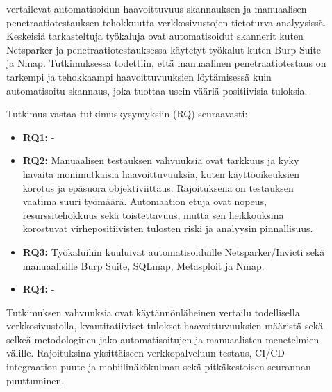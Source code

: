 \documentclass[bscthesis,finnish,oneside,biblatex]{uefcsthesis}
\begin{document}
\begin{description}
    \item[\cite{rane2024_analysis_scanning}] vertailevat automatisoidun haavoittuvuus skannauksen ja manuaalisen penetraatiotestauksen tehokkuutta verkkosivustojen tietoturva-analyysissä. Keskeisiä tarkasteltuja työkaluja ovat automatisoidut skannerit kuten Netsparker ja penetraatiotestauksessa käytetyt työkalut kuten Burp Suite ja Nmap. Tutkimuksessa todettiin, että manuaalinen penetraatiotestaus on tarkempi ja tehokkaampi haavoittuvuuksien löytämisessä kuin automatisoitu skannaus, joka tuottaa usein vääriä positiivisia tuloksia.

    Tutkimus vastaa tutkimuskysymyksiin (RQ) seuraavasti:
    \begin{itemize}
        \item \textbf{RQ1:} -
        \item \textbf{RQ2:} Manuaalisen testauksen vahvuuksia ovat tarkkuus ja kyky havaita monimutkaisia haavoittuvuuksia, kuten käyttöoikeuksien korotus ja epäsuora objektiviittaus. Rajoituksena on testauksen vaatima suuri työmäärä. Automaation etuja ovat nopeus, resurssitehokkuus sekä toistettavuus, mutta sen heikkouksina korostuvat virhepositiivisten tulosten riski ja analyysin pinnallisuus.
        \item \textbf{RQ3:} Työkaluihin kuuluivat automatisoiduille Netsparker/Invicti sekä manuaalisille Burp Suite, SQLmap, Metasploit ja Nmap.
        \item \textbf{RQ4:} -
    \end{itemize}

     Tutkimuksen vahvuuksia ovat käytännönläheinen vertailu todellisella verkkosivustolla, kvantitatiiviset tulokset haavoittuvuuksien määristä sekä selkeä metodologinen jako automatisoitujen ja manuaalisten menetelmien välille. Rajoituksina yksittäiseen verkkopalveluun testaus, CI/CD-integraation puute ja mobiilinäkökulman sekä pitkäkestoisen seurannan puuttuminen.
\end{description}
\end{document}
